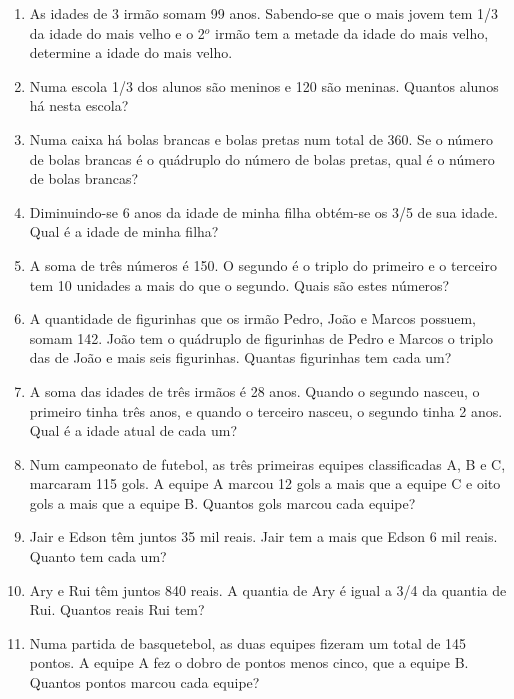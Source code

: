 \begin{enumerate}
						\item As idades de 3 irmão somam 99 anos. Sabendo-se que o mais jovem tem 1/3 da idade do mais velho e o 2$^{o}$ irmão tem a metade da idade do mais velho, determine a idade do mais velho.

						\item Numa escola 1/3 dos alunos são meninos e 120 são meninas. Quantos alunos há nesta escola?

						\item Numa caixa há bolas brancas e bolas pretas num total de 360. Se o número de bolas brancas é o quádruplo do número de bolas pretas, qual é o número de bolas brancas?

						\item Diminuindo-se 6 anos da idade de minha filha obtém-se os 3/5 de sua idade. Qual é a idade de minha filha?

						\item A soma de três números é 150. O segundo é o triplo do primeiro e o terceiro tem 10 unidades a mais do que o segundo. Quais são estes números?

						\item A quantidade de figurinhas que os irmão Pedro, João e Marcos possuem, somam 142. João tem o quádruplo de figurinhas de Pedro e Marcos o triplo das de João e mais seis figurinhas. Quantas figurinhas tem cada um?

						\item A soma das idades de três irmãos é 28 anos. Quando o segundo nasceu, o primeiro tinha três anos, e quando o terceiro nasceu, o segundo tinha 2 anos. Qual é a idade atual de cada um?

						\item Num campeonato de futebol, as três primeiras equipes classificadas A, B e C,  marcaram 115 gols. A equipe A marcou 12 gols a mais que a equipe C e oito gols a mais que a equipe B. Quantos gols marcou cada equipe?

						\item Jair e Edson têm juntos 35 mil reais. Jair tem a mais que Edson 6 mil reais. Quanto tem cada um?

						\item Ary e Rui têm juntos 840 reais. A quantia de Ary é igual a 3/4 da quantia de Rui. Quantos reais Rui tem?

						\item Numa partida de basquetebol, as duas equipes fizeram um total de 145 pontos. A equipe A fez o dobro de pontos menos cinco, que a equipe B. Quantos pontos marcou cada equipe? 
					\end{enumerate}
